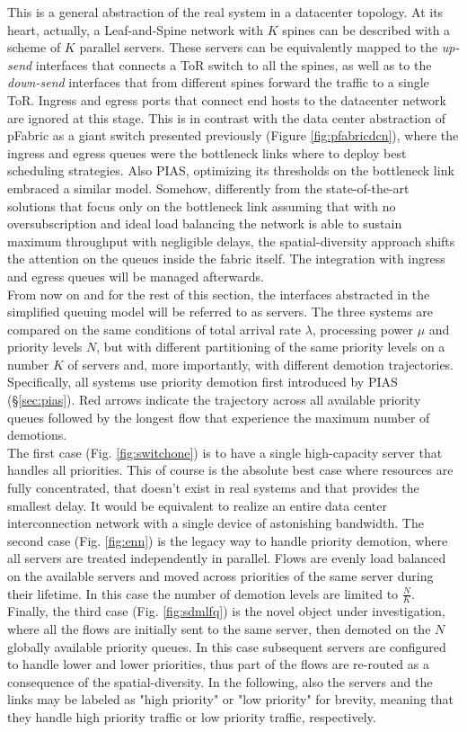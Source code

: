 This is a general abstraction of the real system in a datacenter topology. At its heart, actually, a Leaf-and-Spine network with $K$ spines can be described with a scheme of $K$ parallel servers. These servers can be equivalently mapped to the \textit{up-send} interfaces that connects a ToR switch to all the spines, as well as to the \textit{down-send} interfaces that from different spines forward the traffic to a single ToR. Ingress and egress ports that connect end hosts to the datacenter network are ignored at this stage. This is in contrast with the data center abstraction of pFabric as a giant switch presented previously (Figure \ref{fig:pfabricdcn}), where the ingress and egress queues were the bottleneck links where to deploy best scheduling strategies. Also PIAS, optimizing its thresholds on the bottleneck link embraced a similar model. Somehow, differently from the state-of-the-art solutions that focus only on the bottleneck link assuming that with no oversubscription and ideal load balancing the network is able to sustain maximum throughput with negligible delays, the spatial-diversity approach shifts the attention on the queues inside the fabric itself. The integration with ingress and egress queues will be managed afterwards.\\
From now on and for the rest of this section, the interfaces abstracted in the simplified queuing model will be referred to as servers. The three systems are compared on the same conditions of total arrival rate $\lambda$, processing power $\mu$ and priority levels $N$, but with different partitioning of the same priority levels on a number $K$ of servers and, more importantly, with different demotion trajectories. Specifically, all systems use priority demotion first introduced by PIAS (\S \ref{sec:pias}). Red arrows indicate the trajectory across all available priority queues followed by the longest flow that experience the maximum number of demotions. \\
The first case (Fig. \ref{fig:switchone}) is to have a single high-capacity server that handles all priorities. This of course is the absolute best case where resources are fully concentrated, that doesn't exist in real systems and that provides the smallest delay. It would be equivalent to realize an entire data center interconnection network with a single device of astonishing bandwidth. The second case (Fig. \ref{fig:enn}) is the legacy way to handle priority demotion, where all servers are treated independently in parallel. Flows are evenly load balanced on the available servers and moved across priorities of the same server during their lifetime. In this case the number of demotion levels are limited to \small$\frac{N}{K}$\normalsize. Finally, the third case (Fig. \ref{fig:sdmlfq}) is the novel object under investigation, where all the flows are initially sent to the same server, then demoted on the $N$ globally available priority queues. In this case subsequent servers are configured to handle lower and lower priorities, thus part of the flows are re-routed as a consequence of the spatial-diversity. In the following, also the servers and the links may be labeled as "high priority" or "low priority" for brevity, meaning that they handle high priority traffic or low priority traffic, respectively. 

